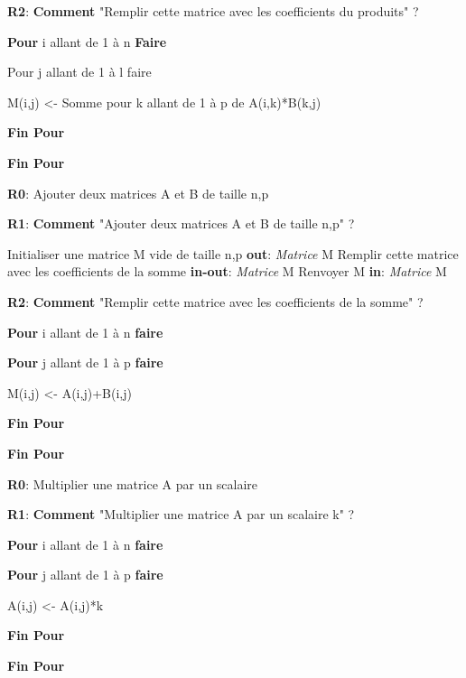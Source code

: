\documentclass{NewTeXRaffinage}
\begin{document}
\textbf{R2}: \textbf{Comment} "Remplir cette matrice avec les coefficients du produits" ?
\begin{addmargin}[5em]{0pt}
    \textbf{Pour} i allant de 1 à n \textbf{Faire}
    \begin{addmargin}[3em]{0pt}
        Pour j allant de 1 à l faire
        \begin{addmargin}[3em]{0pt}
            M(i,j) <- Somme pour k allant de 1 à p de A(i,k)*B(k,j)
        \end{addmargin}
        \textbf{Fin Pour}
    \end{addmargin}
    \textbf{Fin Pour}
\end{addmargin}

\textbf{R0}: Ajouter deux matrices A et B de taille n,p

\textbf{R1}: \textbf{Comment} "Ajouter deux matrices A et B de taille n,p" ?
\begin{addmargin}[5em]{0pt}
    Initialiser une matrice M vide de taille n,p \hspace*{0pt}\hfill \textbf{out}: \textit{Matrice} M 
    \newline Remplir cette matrice avec les coefficients de la somme \hspace*{0pt}\hfill  \textbf{in-out}: \textit{Matrice} M 
    \newline Renvoyer M \hspace*{0pt}\hfill \textbf{in}: \textit{Matrice} M 
\end{addmargin}

\textbf{R2}: \textbf{Comment} "Remplir cette matrice avec les coefficients de la somme" ?
\begin{addmargin}[5em]{0pt}
    \textbf{Pour} i allant de 1 à n \textbf{faire}
    \begin{addmargin}[3em]{0pt}
        \textbf{Pour} j allant de 1 à p \textbf{faire}
        \begin{addmargin}[3em]{0pt}
            M(i,j) <- A(i,j)+B(i,j)
        \end{addmargin}
        \textbf{Fin Pour}
    \end{addmargin}
    \textbf{Fin Pour}
\end{addmargin}



\textbf{R0}: Multiplier une matrice A par un scalaire

\textbf{R1}: \textbf{Comment} "Multiplier une matrice A par un scalaire k" ?
\begin{addmargin}[5em]{0pt}
    \textbf{Pour} i allant de 1 à n \textbf{faire}
    \begin{addmargin}[3em]{0pt}
        \textbf{Pour} j allant de 1 à p \textbf{faire}
        \begin{addmargin}[3em]{0pt}
            A(i,j) <- A(i,j)*k
        \end{addmargin}
        \textbf{Fin Pour}
    \end{addmargin}
    \textbf{Fin Pour}
\end{addmargin}
\end{document}
